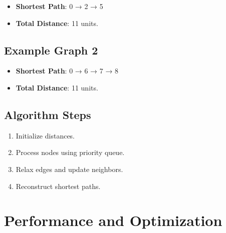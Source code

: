 \documentclass{article}
\begin{document}
\begin{center}
\end{center}

\begin{itemize}
    \item \textbf{Shortest Path}: 0 → 2 → 5
    \item \textbf{Total Distance}: 11 units.
\end{itemize}

\subsection{Example Graph 2}

\begin{center}
\end{center}

\begin{itemize}
    \item \textbf{Shortest Path}: 0 → 6 → 7 → 8
    \item \textbf{Total Distance}: 11 units.
\end{itemize}

\subsection{Algorithm Steps}

\begin{enumerate}
    \item Initialize distances.
    \item Process nodes using priority queue.
    \item Relax edges and update neighbors.
    \item Reconstruct shortest paths.
\end{enumerate}

\section{Performance and Optimization}
\end{document}
